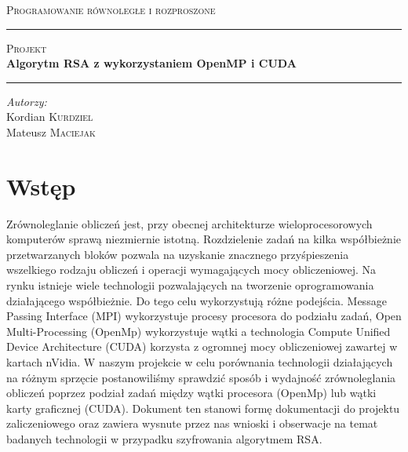 \documentclass[a4paper,12pt]{article}
\newcommand{\linia}{\rule{\linewidth}{0.4mm}}
\begin{document}
	\begin{titlepage}
	\begin{center}
	
	\textsc{\LARGE Programowanie równoległe i rozproszone}\\[1.5cm]
	\linia\newline
	\textsc{\Large Projekt}\\[0.5cm]
	{ \huge \bfseries Algorytm RSA z wykorzystaniem OpenMP i CUDA \\[0.4cm] }
	\linia\newline

		\noindent
		\begin{minipage}{0.4\textwidth}
		\begin{flushleft} \large
		\emph{Autorzy:}\\
		Kordian \textsc{Kurdziel}\\Mateusz \textsc{Maciejak} 
		\end{flushleft}
		\end{minipage}

	\vfill

	\end{center}
	\end{titlepage}
\newpage
\section*{Wstęp}

Zrównoleglanie obliczeń jest, przy obecnej architekturze wieloprocesorowych komputerów sprawą niezmiernie istotną. Rozdzielenie zadań na kilka współbieżnie przetwarzanych bloków pozwala na uzyskanie znacznego przyśpieszenia wszelkiego rodzaju obliczeń i operacji wymagających mocy obliczeniowej. Na rynku istnieje wiele technologii pozwalających na tworzenie oprogramowania działającego współbieżnie. Do tego celu wykorzystują różne podejścia. Message Passing Interface (MPI) wykorzystuje procesy procesora do podziału zadań, Open Multi-Processing (OpenMp) wykorzystuje wątki a technologia Compute Unified Device Architecture (CUDA) korzysta z ogromnej mocy obliczeniowej zawartej w kartach nVidia.
    W naszym projekcie w celu porównania technologii działających na różnym sprzęcie postanowiliśmy sprawdzić sposób i wydajność zrównoleglania obliczeń poprzez podział zadań między wątki procesora (OpenMp) lub wątki karty graficznej (CUDA). Dokument ten stanowi formę dokumentacji do projektu zaliczeniowego oraz zawiera wysnute przez nas wnioski i obserwacje na temat badanych technologii w przypadku szyfrowania algorytmem RSA.
\end{document}
